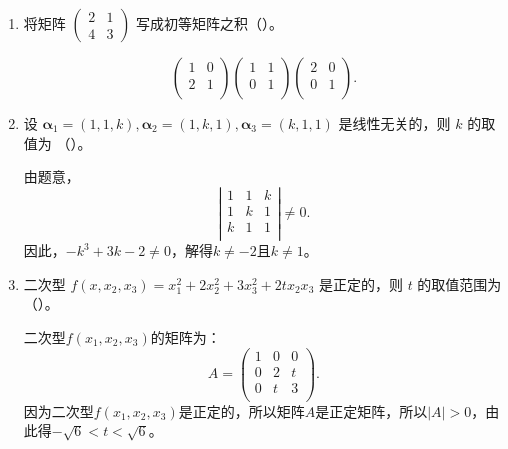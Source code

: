 \begin{enumerate}[1~]
\begin{enumerate}[1.~]
\item
将矩阵 $\left( \begin{smallmatrix} { 2 } & { 1 } \\ { 4 } & { 3 } \end{smallmatrix} \right)$ 写成初等矩阵之积（\quad）。

\begin{solution}
$$\left( \begin{matrix}
	1&		0\\
	2&		1\\
\end{matrix} \right) \left( \begin{matrix}
	1&		1\\
	0&		1\\
\end{matrix} \right) \left( \begin{matrix}
	2&		0\\
	0&		1\\
\end{matrix} \right).$$
\end{solution}

\item
设 $\boldsymbol{\alpha} _ { 1 } = ( 1, 1, k ) , \boldsymbol{\alpha} _ { 2 } = ( 1 , k , 1 ) , \boldsymbol{\alpha} _ { 3 } = ( k, 1, 1 )$ 是线性无关的，则 $k$ 的取值为 （\quad）。
\begin{solution}
由题意，\[
\left| \begin{matrix}
	1&		1&		k\\
	1&		k&		1\\
	k&		1&		1\\
\end{matrix} \right|\ne 0.
\]
因此，$-k^3+3k-2\ne 0$，解得$k\ne -2$且$k\ne 1$。
\end{solution}

\item
二次型 $f \left( x , x _ { 2 } , x _ { 3 } \right) = x _ { 1 } ^ { 2 } + 2 x _ { 2 } ^ { 2 } + 3 x _ { 3 } ^ { 2 } + 2 t x _ { 2 } x _ { 3 }$ 是正定的，则 $t$ 的取值范围为（\quad）。
\begin{solution}
二次型$f(x_1, x_2, x_3)$的矩阵为：\[
A=\left( \begin{matrix}
	1&		0&		0\\
	0&		2&		t\\
	0&		t&		3\\
\end{matrix} \right) .
\]
因为二次型$f(x_1, x_2, x_3)$是正定的，所以矩阵$A$是正定矩阵，所以$|A|>0$，由此得$-\sqrt{6}<t<\sqrt{6}$。
\end{solution}


\end{enumerate}
\end{enumerate}

